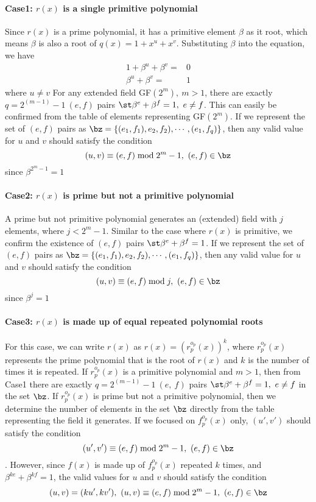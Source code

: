 \paragraph{ Case1: $r(x)$ is a single primitive polynomial \newline}
Since $r(x)$ is a prime polynomial, it has a primitive element $\beta$ as it root, which means $\beta$ is also a root of $q(x)=1+x^u+x^v$. Substituting $\beta$ into the equation, we have 
\begin{equation}
\begin{split}
1+\beta^u+\beta^v=&0\\
\beta^u+\beta^v=&1
\end{split}
\end{equation}
where $u\neq v$
For any extended field GF$(2^m),~m >1$, there are exactly $q=2^{(m-1)}-1 ~(e,f)$ pairs $\st \beta^e+\beta^f=1,~e\neq f$. This can easily be confirmed from the table of elements representing GF$(2^m)$. If we represent the set of $(e,f)$ pairs as 
$\bz=\{ (e_1,f_1) , e_2,f_2),\cdots,(e_1,f_q)\} $, then any valid value for $u$ and $v$ should satisfy the condition
$$(u,v) \equiv (e,f) \bmod 2^m-1,~(e,f)\in \bz$$ since $\beta^{2^{m}-1}=1$

\paragraph{Case2: $r(x)$ is prime but not a primitive polynomial\newline}
A prime but not primitive polynomial generates an (extended) field with $j$ elements, where $j<2^m-1$. Similar to the case where $r(x)$ is primitive, we confirm the existence of $(e,f)$ pairs $ \st \beta^e + \beta^f =1$. 
If we represent the set of $(e,f)$ pairs as 
$\bz=\{ (e_1,f_1) , e_2,f_2),\cdots,(e_1,f_q)\} $, then any valid value for $u$ and $v$ should satisfy the condition
$$(u,v) \equiv (e,f) \bmod j,~(e,f)\in \bz$$ since $\beta^{j}=1$

\paragraph{Case3: $r(x)$ is made up of equal repeated polynomial roots\newline}
For this case, we can write $r(x)$ as 
$r(x)=(r^{o_p}_p(x))^k$, where $r^{o_p}_p(x)$ represents the prime polynomial that is the root of $r(x)$ and $k$ is the number of times it is repeated. If $r^{o_p}_p(x)$ is a primitive polynomial and $m>1$, then from Case1 there are exactly $q=2^{(m-1)}-1~(e,~f)$ pairs $\st \beta^e+\beta^f=1,~e \neq f$ in the set $\bz$. 
If $r^{o_p}_p(x)$ is prime but not a primitive polynomial, then we determine the number of elements in the set $\bz$ directly from the table representing the field it generates.
 If we focused on $f^{o_p}_p(x)$ only, $(u',v')$ should satisfy the condition$$ (u',v') \equiv (e,f)\bmod 2^{m}-1,~(e, f) \in \bz$$. However, since $f(x)$ is made up of $f^{o_p}_p(x)$ repeated $k$ times, and $\beta^{ke}+\beta^{kf}=1$, the valid values for $u$ and $v$
 should satisfy the condition
 $$(u,v)=(ku',kv'),~(u,v) \equiv (e,f)\bmod 2^{m}-1,~(e, f) \in \bz $$

